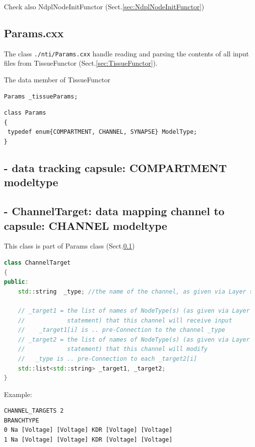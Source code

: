 Check also NdplNodeInitFunctor (Sect.\ref{sec:NdplNodeInitFunctor})

\subsection{Params.cxx}
\label{sec:Params.cxx}

The class \verb!./nti/Params.cxx! handle reading and parsing the contents of all
input files from TissueFunctor (Sect.\ref{sec:TissueFunctor}).

The data member of TissueFunctor
\begin{verbatim}
Params _tissueParams;
\end{verbatim}

\begin{verbatim}
class Params
{
 typedef enum{COMPARTMENT, CHANNEL, SYNAPSE} ModelType;
}
\end{verbatim}

\subsection{- data tracking capsule: COMPARTMENT modeltype}

\subsection{- ChannelTarget: data mapping channel to capsule: CHANNEL modeltype}

This class is part of Params class (Sect.\ref{sec:Params.cxx})

\begin{lstlisting}[language=C++]
class ChannelTarget
{
public:
    std::string  _type; //the name of the channel, as given via Layer statement
    
    // _target1 = the list of names of NodeType(s) (as given via Layer
    //            statement) that this channel will receive input
    //    _target1[i] is .. pre-Connection to the channel _type
    // _target2 = the list of names of NodeType(s) (as given via Layer
    //            statement) that this channel will modify
    //   _type is .. pre-Connection to each _target2[i]
    std::list<std::string> _target1, _target2;
}
\end{lstlisting}

Example:
\begin{verbatim}
CHANNEL_TARGETS 2
BRANCHTYPE
0 Na [Voltage] [Voltage] KDR [Voltage] [Voltage]
1 Na [Voltage] [Voltage] KDR [Voltage] [Voltage]
\end{verbatim}



